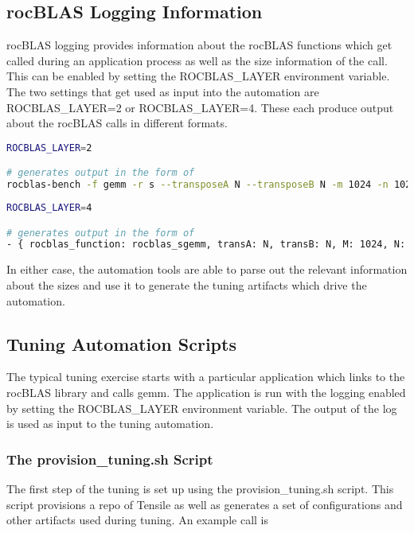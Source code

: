 \documentclass[]{article}
\begin{document}
\subsection{rocBLAS Logging Information}

rocBLAS logging provides information about the rocBLAS functions which get called during an application process as well as the size information of the call. This can be enabled by setting the ROCBLAS\_LAYER environment variable. The two settings that get used as input into the automation are ROCBLAS\_LAYER=2 or ROCBLAS\_LAYER=4. These each produce output about the rocBLAS calls in different formats.

\begin{lstlisting}[language=bash,breaklines=true]
ROCBLAS_LAYER=2

# generates output in the form of
rocblas-bench -f gemm -r s --transposeA N --transposeB N -m 1024 -n 1024 -k 1024 --beta 0.0 --alpha 1.0 --lda 1024 --ldb 1024 --ldc 1024 
\end{lstlisting}

\begin{lstlisting}[language=bash,breaklines=true]
ROCBLAS_LAYER=4

# generates output in the form of
- { rocblas_function: rocblas_sgemm, transA: N, transB: N, M: 1024, N: 1024, K: 1024, lda: 1024, ldb: 1024, ldc: 1024}
\end{lstlisting}

\noindent
In either case, the automation tools are able to parse out the relevant information about the sizes and use it to generate the tuning artifacts which drive the automation.

\subsection{Tuning Automation Scripts}

The typical tuning exercise starts with a particular application which links to the rocBLAS library and calls gemm. The application is run with the logging enabled by setting the ROCBLAS\_LAYER environment variable. The output of the log is used as input to the tuning automation. 

\subsubsection{The provision\_tuning.sh Script}

The first step of the tuning is set up using the provision\_tuning.sh script. This script provisions a repo of Tensile as well as generates a set of configurations and other artifacts used during tuning. An example call is
\end{document}
